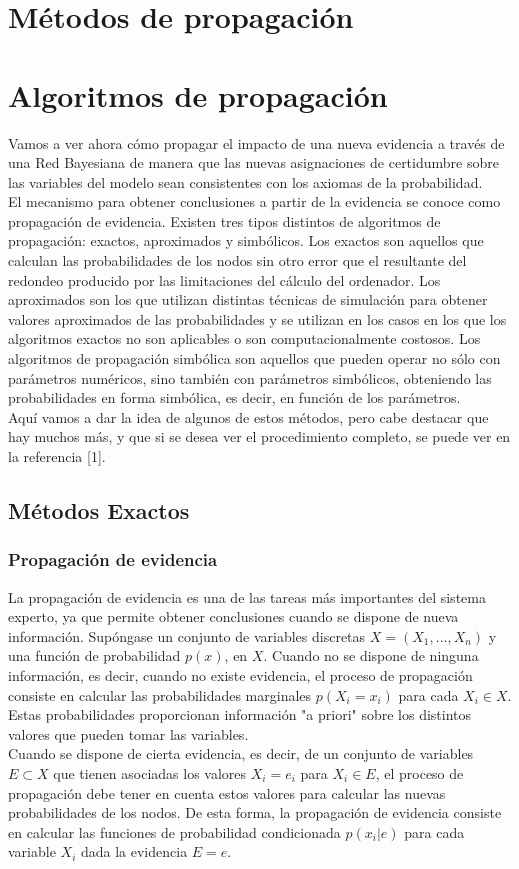 \documentclass{article}
\theoremstyle{definition_wo_parentheses}
\begin{document}
\section{Métodos de propagación}
\section{Algoritmos de propagación}
Vamos a ver ahora cómo propagar el impacto de una nueva evidencia a través de una Red Bayesiana de manera que las nuevas asignaciones de certidumbre sobre las variables del modelo sean consistentes con los axiomas de la probabilidad.\\
El mecanismo para obtener conclusiones a partir de la evidencia se conoce como propagación de evidencia. Existen tres tipos distintos de algoritmos de propagación: exactos, aproximados y simbólicos. Los exactos son aquellos que calculan las probabilidades de los nodos sin otro error que el resultante del redondeo producido por las limitaciones del cálculo del ordenador. Los aproximados son los que utilizan distintas técnicas de simulación para obtener valores aproximados de las probabilidades y se utilizan en los casos en los que los algoritmos exactos no son aplicables o son computacionalmente costosos. Los algoritmos de propagación simbólica son aquellos que pueden operar no sólo con parámetros numéricos, sino también con parámetros simbólicos, obteniendo las probabilidades en forma simbólica, es decir, en función de los parámetros.\\

Aquí vamos a dar la idea de algunos de estos métodos, pero cabe destacar que hay muchos más, y que si se desea ver el procedimiento completo, se puede ver en la referencia [1].

\subsection{Métodos Exactos}

\subsubsection{Propagación de evidencia}
La propagación de evidencia es una de las tareas más importantes del sistema experto, ya que permite obtener conclusiones cuando se dispone de nueva información. Supóngase un conjunto de variables discretas $X=(X_1,...,X_n)$ y una función de probabilidad $p(x)$, en $X$. Cuando no se dispone de ninguna información, es decir, cuando no existe evidencia, el proceso de propagación consiste en calcular las probabilidades marginales $p(X_i=x_i)$ para cada $X_i \in X$. Estas probabilidades proporcionan información "a priori" sobre los distintos valores que pueden tomar las variables.\\
Cuando se dispone de cierta evidencia, es decir, de un conjunto de variables $E \subset X$ que tienen asociadas los valores $X_i = e_i$ para $X_i \in E$, el proceso de propagación debe tener en cuenta estos valores para calcular las nuevas probabilidades de los nodos. De esta forma, la propagación de evidencia consiste en calcular las funciones de probabilidad condicionada $p(x_i|e)$ para cada variable $X_i$ dada la evidencia $E=e$.\\
\end{document}
